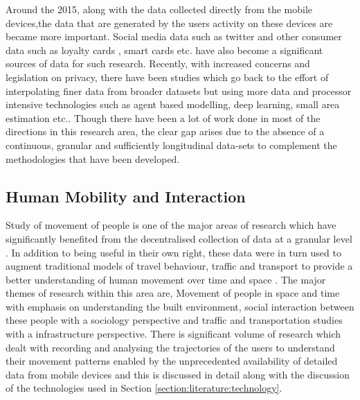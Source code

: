 Around the 2015, along with the data collected directly from the mobile devices,the data that are generated by the users activity on these devices are became more important.
Social media data such as twitter \citep{lansley2016a} and other consumer data such as loyalty cards \citep{lloyd2018}, smart cards \citep{ordonez2012} etc. have also become a significant sources of data for such research.
Recently, with increased concerns and legislation on privacy, there have been studies which go back to the effort of interpolating finer data from broader datasets but using more data and processor intensive technologies such as agent based modelling, deep learning, small area estimation \citep{crols2019, shibata2019, rao2015} etc..
Though there have been a lot of work done in most of the directions in this research area, the clear gap arises due to the absence of a continuous, granular and sufficiently longitudinal data-sets to complement the methodologies that have been developed. 

\subsection{Human Mobility and Interaction}

Study of movement of people is one of the major areas of research which have significantly benefited from the decentralised collection of data at a granular level \cite{castells2000}.
In addition to being useful in their own right, these data were in turn used to augment traditional models of travel behaviour, traffic and transport to provide a better understanding of human movement over time and space \citep{janssens2013}.
The major themes of research within this area are, Movement of people in space and time with emphasis on understanding the built environment, social interaction between these people with a sociology perspective and traffic and transportation studies with a infrastructure perspective.
There is significant volume of research which dealt with recording and analysing the trajectories of the users to understand their movement patterns enabled by the unprecedented availability of detailed data from mobile devices and this is discussed in detail along with the discussion of the technologies used in Section \ref{section:literature:technology}.


